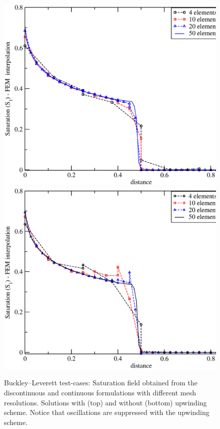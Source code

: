 \begin{figure}[h]
\vbox{
\hbox{\hspace{.3cm}\includegraphics[width=.9\textwidth]{diagrams/bl-dg-4-10-20.eps}}
\vspace{-0.cm}
\hbox{\hspace{.3cm}\includegraphics[width=.9\textwidth]{diagrams/bl-dg-cent-4-10-20.eps}}}
\caption{Buckley--Leverett test-cases: Saturation field obtained from the discontinuous and continuous formulations with different mesh resolutions. Solutions with (top) and without (bottom) upwinding scheme. Notice that oscillations are suppressed with the upwinding scheme.\label{bl-dg-cent-4-10-20}}
\end{figure}


